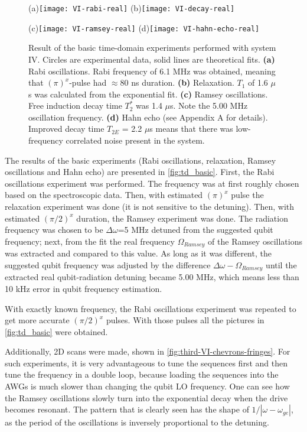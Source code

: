 \documentclass[12pt, twoside]{report}
\numberwithin{equation}{section}
\begin{document}
\begin{figure}
(a)\texttt{[image: VI-rabi-real]}
(b)\texttt{[image: VI-decay-real]}

(c)\texttt{[image: VI-ramsey-real]}
(d)\texttt{[image: VI-hahn-echo-real]}
\caption{Result of the basic time-domain experiments performed with system IV. Circles are experimental data, solid lines are theoretical fits. \textbf{(a)} Rabi oscillations. Rabi frequency of 6.1 MHz was obtained, meaning that $(\pi)^x$-pulse had $\approx$80 ns duration. \textbf{(b)} Relaxation. $T_1$ of 1.6 $\mu$s was calculated from the exponential fit. \textbf{(c)} Ramsey oscillations. Free induction decay time $T_2^*$ was 1.4 $\mu$s. Note the 5.00 MHz oscillation frequency. \textbf{(d)} Hahn echo (see Appendix A for details). Improved decay time $T_{2E}$ = 2.2 $\mu$s means that there was low-frequency correlated noise present in the system.}
\label{fig:td_basic}
\end{figure}

The results of the basic experiments (Rabi oscillations, relaxation, Ramsey oscillations and Hahn echo) are presented in \autoref{fig:td_basic}. First, the Rabi oscillations experiment was performed. The frequency was at first roughly chosen based on the spectroscopic data. Then, with estimated $(\pi)^x$ pulse the relaxation experiment was done (it is not sensitive to the detuning). Then, with estimated $(\pi/2)^x$ duration, the Ramsey experiment was done. The radiation frequency was chosen to be $\Delta \omega$=5 MHz detuned from the suggested qubit frequency; next, from the fit the real frequency $\Omega_{Ramsey}$ of the Ramsey oscillations was extracted and compared to this value. As long as it was different, the suggested qubit frequency was adjusted by the difference $\Delta \omega -\Omega_{Ramsey}$ until the extracted real qubit-radiation detuning became 5.00 MHz, which means less than 10 kHz error in qubit frequency estimation.

With exactly known frequency, the Rabi oscillations experiment was repeated to get more accurate $(\pi/2)^x$ pulses. With those pulses all the pictures in \autoref{fig:td_basic} were obtained.

Additionally, 2D scans were made, shown in \autoref{fig:third-VI-chevrons-fringes}. For such experiments, it is very advantageous to tune the sequences first and then tune the frequency in a double loop, because loading the sequences into the AWGs is much slower than changing the qubit LO frequency. One can see how the Ramsey oscillations slowly turn into the exponential decay when the drive becomes resonant. The pattern that is clearly seen has the shape of $1/|\omega-\omega_{ge}|$, as the period of the oscillations is inversely proportional to the detuning.
\end{document}
